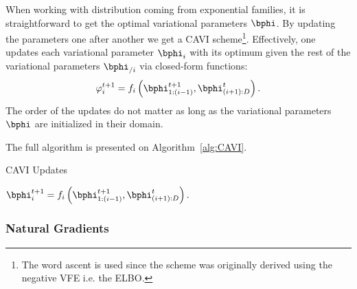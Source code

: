 When working with distribution coming from exponential families, it is straightforward to get the optimal variational parameters $\bphi$.
By updating the parameters one after another we get a \ac{CAVI} scheme\footnote{The word ascent is used since the scheme was originally derived using the negative \ac{VFE} i.e. the \ac{ELBO}.}.
Effectively, one updates each variational parameter $\bphi_i$ with its optimum given the rest of the variational parameters $\bphi_{/i}$ via closed-form functions:
\begin{align}
\varphi_i^{t+1} = f_i\left(\bphi_{1:(i-1)}^{t+1}, \bphi_{(i+1):D}^t\right).
\end{align}
The order of the updates do not matter as long as the variational parameters $\bphi$ are initialized in their domain.

The full algorithm is presented on Algorithm~\ref{alg:CAVI}.

\begin{algorithm}
    \caption{\ac{CAVI} Updates}
    \label{alg:CAVI}
    \begin{algorithmic}
                \State $\bphi_i^{t+1} = f_i\left(\bphi_{1:(i-1)}^{t+1}, \bphi_{(i+1):D}^t\right).$
            \EndFor
        \EndWhile
    \end{algorithmic}
\end{algorithm}


\subsubsection{Natural Gradients}

